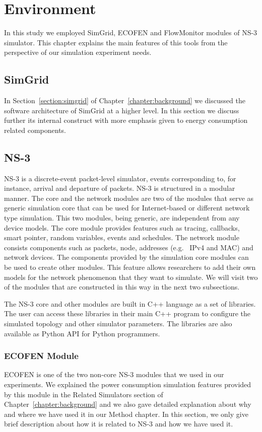 \chapter{Environment}
\label{chapter:environment}
In this study we employed SimGrid, ECOFEN and FlowMonitor modules of NS-3 simulator. This chapter explains the main features of this tools from the perspective of our simulation experiment needs.
\section{SimGrid}
In Section~\ref{section:simgrid} of Chapter~\ref{chapter:background} we discussed the software architecture of SimGrid at a higher level. In this section we discuss further its internal construct with more emphasis given to energy consumption related components.
\section{NS-3}
NS-3 is a discrete-event packet-level simulator, events corresponding to, for instance, arrival and departure of packets. NS-3 is structured in a modular manner. The core and the network modules are two of the modules that serve as generic simulation core that can be used for Internet-based or different network type simulation. This two modules, being generic, are independent from any device models. The core module provides features such as tracing, callbacks, smart pointer, random variables, events and schedules. The network module consists components such as packets, node, addresses (e.g.{\ } IPv4 and MAC) and network devices. The components provided by the simulation core modules can be used to create other modules. This feature allows researchers to add their own models for the network phenomenon that they want to simulate. We will visit two of the modules that are constructed in this way in the next two subsections\cite{ns3}. 

The NS-3 core and other modules are built in C++ language as a set of libraries. The user can access these libraries in their main C++ program to configure the simulated topology and other simulator parameters. The libraries are also available as Python API for Python programmers. 
\subsection{ECOFEN Module}
ECOFEN is one of the two non-core NS-3 modules that we used in our experiments. We explained the power consumption simulation features provided by this module in the Related Simulators section of Chapter~\ref{chapter:background} and we also gave detailed explanation about why and where we have used it in our Method chapter. In this section, we only give brief description about how it is related to NS-3 and how we have used it. 

